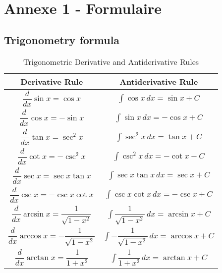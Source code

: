 \chapter{Annexe 1 - Formulaire}

\section{Trigonometry formula}

\begin{table}[h]
\centering
\begin{tabular}{|c|c|}
\hline
\textbf{Derivative Rule} & \textbf{Antiderivative Rule} \\
\hline
$\dfrac{d}{dx}\sin x = \cos x$ & $\int \cos x \, dx = \sin x + C$ \\
\hline
$\dfrac{d}{dx}\cos x = -\sin x$ & $\int \sin x \, dx = -\cos x + C$ \\
\hline
$\dfrac{d}{dx}\tan x = \sec^2 x$ & $\int \sec^2 x \, dx = \tan x + C$ \\
\hline
$\dfrac{d}{dx}\cot x = -\csc^2 x$ & $\int \csc^2 x \, dx = -\cot x + C$ \\
\hline
$\dfrac{d}{dx}\sec x = \sec x\tan x$ & $\int \sec x\tan x \, dx = \sec x + C$ \\
\hline
$\dfrac{d}{dx}\csc x = -\csc x\cot x$ & $\int \csc x\cot x \, dx = -\csc x + C$ \\
\hline
$\dfrac{d}{dx}\arcsin x = \dfrac{1}{\sqrt{1-x^2}}$ & $\int \dfrac{1}{\sqrt{1-x^2}} \, dx = \arcsin x + C$ \\
\hline
$\dfrac{d}{dx}\arccos x = -\dfrac{1}{\sqrt{1-x^2}}$ & $\int -\dfrac{1}{\sqrt{1-x^2}} \, dx = \arccos x + C$ \\
\hline
$\dfrac{d}{dx}\arctan x = \dfrac{1}{1+x^2}$ & $\int \dfrac{1}{1+x^2} \, dx = \arctan x + C$ \\

\hline
\end{tabular}
\caption{Trigonometric Derivative and Antiderivative Rules}
\label{tab:trig-rules}
\end{table}